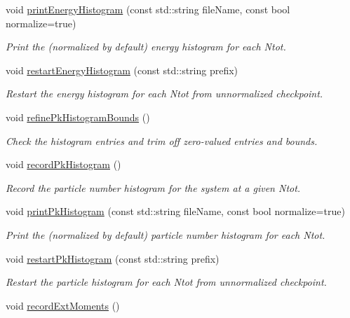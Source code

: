 \begin{DoxyCompactItemize}
void \hyperlink{classsim_system_a6ef1ba3e08ec44d865436e272cdebc9b}{print\-Energy\-Histogram} (const std\-::string file\-Name, const bool normalize=true)
\begin{DoxyCompactList}\small\item\em Print the (normalized by default) energy histogram for each Ntot. \end{DoxyCompactList}\item 
void \hyperlink{classsim_system_ae073008ed44e551f0d008b2f5a0fc06f}{restart\-Energy\-Histogram} (const std\-::string prefix)
\begin{DoxyCompactList}\small\item\em Restart the energy histogram for each Ntot from unnormalized checkpoint. \end{DoxyCompactList}\item 
void \hyperlink{classsim_system_a1e462fcb63389d59419ff6135b2d802e}{refine\-Pk\-Histogram\-Bounds} ()
\begin{DoxyCompactList}\small\item\em Check the histogram entries and trim off zero-\/valued entries and bounds. \end{DoxyCompactList}\item 
void \hyperlink{classsim_system_a71bbc9d8bdbb5042e4fa817c3e71fe53}{record\-Pk\-Histogram} ()
\begin{DoxyCompactList}\small\item\em Record the particle number histogram for the system at a given Ntot. \end{DoxyCompactList}\item 
void \hyperlink{classsim_system_ac29bdd6f7fa6f9526b7eafcf658d70d8}{print\-Pk\-Histogram} (const std\-::string file\-Name, const bool normalize=true)
\begin{DoxyCompactList}\small\item\em Print the (normalized by default) particle number histogram for each Ntot. \end{DoxyCompactList}\item 
void \hyperlink{classsim_system_a3239a23e35f30e40eeecf8795386c164}{restart\-Pk\-Histogram} (const std\-::string prefix)
\begin{DoxyCompactList}\small\item\em Restart the particle histogram for each Ntot from unnormalized checkpoint. \end{DoxyCompactList}\item 
void \hyperlink{classsim_system_a74ce0ab8151fd0501abf853a16cc8e58}{record\-Ext\-Moments} ()

\end{DoxyCompactItemize}
